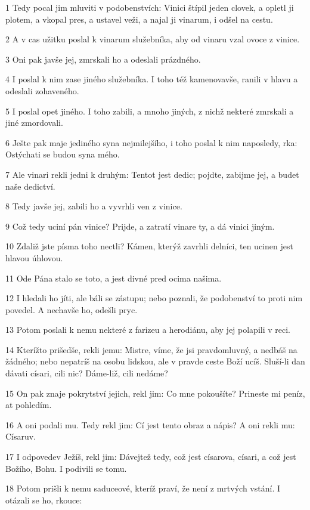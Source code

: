 \par 1 Tedy pocal jim mluviti v podobenstvích: Vinici štípil jeden clovek, a opletl ji plotem, a vkopal pres, a ustavel veži, a najal ji vinarum, i odšel na cestu.
\par 2 A v cas užitku poslal k vinarum služebníka, aby od vinaru vzal ovoce z vinice.
\par 3 Oni pak javše jej, zmrskali ho a odeslali prázdného.
\par 4 I poslal k nim zase jiného služebníka. I toho též kamenovavše, ranili v hlavu a odeslali zohaveného.
\par 5 I poslal opet jiného. I toho zabili, a mnoho jiných, z nichž nekteré zmrskali a jiné zmordovali.
\par 6 Ješte pak maje jediného syna nejmilejšího, i toho poslal k nim naposledy, rka: Ostýchati se budou syna mého.
\par 7 Ale vinari rekli jedni k druhým: Tentot jest dedic; pojdte, zabijme jej, a budet naše dedictví.
\par 8 Tedy javše jej, zabili ho a vyvrhli ven z vinice.
\par 9 Což tedy uciní pán vinice? Prijde, a zatratí vinare ty, a dá vinici jiným.
\par 10 Zdaliž jste písma toho nectli? Kámen, kterýž zavrhli delníci, ten ucinen jest hlavou úhlovou.
\par 11 Ode Pána stalo se toto, a jest divné pred ocima našima.
\par 12 I hledali ho jíti, ale báli se zástupu; nebo poznali, že podobenství to proti nim povedel. A nechavše ho, odešli pryc.
\par 13 Potom poslali k nemu nekteré z farizeu a herodiánu, aby jej polapili v reci.
\par 14 Kterížto prišedše, rekli jemu: Mistre, víme, že jsi pravdomluvný, a nedbáš na žádného; nebo nepatríš na osobu lidskou, ale v pravde ceste Boží ucíš. Sluší-li dan dávati císari, cili nic? Dáme-liž, cili nedáme?
\par 15 On pak znaje pokrytství jejich, rekl jim: Co mne pokoušíte? Prineste mi peníz, at pohledím.
\par 16 A oni podali mu. Tedy rekl jim: Cí jest tento obraz a nápis? A oni rekli mu: Císaruv.
\par 17 I odpovedev Ježíš, rekl jim: Dávejtež tedy, což jest císarova, císari, a což jest Božího, Bohu. I podivili se tomu.
\par 18 Potom prišli k nemu saduceové, kteríž praví, že není z mrtvých vstání. I otázali se ho, rkouce:
